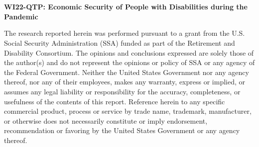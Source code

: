 \documentclass[12pt]{article}
\begin{document}
\thispagestyle{empty}
\cleardoublepage{}

\hspace{-2cm}\begin{minipage}[b]{0.3\linewidth}
\begin{flushleft}
 
\vspace{6cm}

\textsf{ } \\
\textsf{ } \\
\end{flushleft}
\end{minipage}

\hspace{5cm}\begin{minipage}[t]{0.8\textwidth}
\begin{center}

\Large{\textbf{\textsf{WI22-QTP: Economic Security of People with Disabilities during the Pandemic }}}\\
\end{center}
\end{minipage}

\hspace{5cm}\begin{minipage}[t]{0.7\textwidth}


\begin{flushleft}
\vspace{6cm}

\footnotesize{\textsf{The research reported herein was performed pursuant to a grant from the U.S. Social Security Administration (SSA) funded as part of the Retirement and Disability Consortium. The opinions and conclusions expressed are solely those of the author(s) and do not represent the opinions or policy of SSA or any agency of the Federal Government. Neither the United States Government nor any agency thereof, nor any of their employees, makes any warranty, express or implied, or assumes any legal liability or responsibility for the accuracy, completeness, or usefulness of the contents of this report. Reference herein to any specific commercial product, process or service by trade name, trademark, manufacturer, or otherwise does not necessarily constitute or imply endorsement, recommendation or favoring by the United States Government or any agency thereof.}}
\end{flushleft}

\end{minipage}
 
\end{document}
